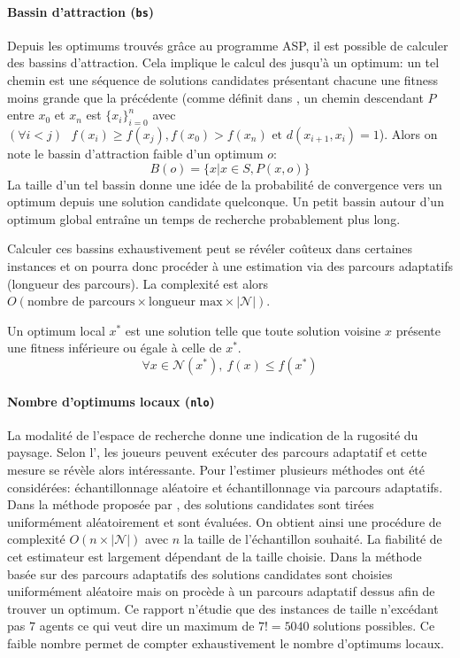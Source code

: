 \documentclass[../main.tex]{subfiles}
\begin{document}
	\paragraph{Bassin d'attraction (\texttt{bs})}{Depuis les optimums trouvés grâce au programme ASP, il est possible de calculer des bassins d'attraction. Cela implique le calcul des  jusqu'à un optimum: un tel chemin est une séquence de solutions candidates présentant chacune une fitness moins grande que la précédente (comme définit dans \cite{pitzer}, un chemin descendant $P$ entre $x_0$ et $x_n$ est $\{x_i\}_{i=0}^n$ avec $(\forall i < j)\text{ }f(x_i) \geq f(x_j), f(x_0) > f(x_n) \text{ et } d(x_{i+1}, x_i) = 1$). Alors on note le bassin d'attraction faible d'un optimum $o$:
	\begin{equation*}
	    B(o) = \{x | x \in S, P(x, o)\}
	\end{equation*}
La taille d'un tel bassin donne une idée de la probabilité de convergence vers un optimum depuis une solution candidate quelconque. Un petit bassin autour d'un optimum global entraîne un temps de recherche probablement plus long.

Calculer ces bassins exhaustivement peut se révéler coûteux dans certaines instances et on pourra donc procéder à une estimation via des parcours adaptatifs \cite{garnier} (longueur des parcours). La complexité est alors $O(\text{nombre de parcours} \times \text{longueur max} \times |\mathcal{N}|)$.
	}
	
\begin{definition}
    Un optimum local $x^*$ est une solution telle que toute solution voisine $x$ présente une fitness inférieure ou égale à celle de $x^*$.
    \begin{equation*}
        \forall x \in \mathcal{N}(x^*),~f(x) \leq f(x^*)
    \end{equation*}
\end{definition}

    \paragraph{Nombre d'optimums locaux (\texttt{nlo})}{
La modalité de l'espace de recherche donne une indication de la rugosité du paysage. Selon l', les joueurs peuvent exécuter des parcours adaptatif et cette mesure se révèle alors intéressante. Pour l'estimer plusieurs méthodes ont été considérées: échantillonnage aléatoire et échantillonnage via parcours adaptatifs. Dans la méthode proposée par \cite{alyahya}, des solutions candidates sont tirées uniformément aléatoirement et sont évaluées. On obtient ainsi une procédure de complexité $O(n \times |\mathcal{N}|)$ avec $n$ la taille de l'échantillon souhaité. La fiabilité de cet estimateur est largement dépendant de la taille choisie. Dans la méthode basée sur des parcours adaptatifs des solutions candidates sont choisies uniformément aléatoire mais on procède à un parcours adaptatif dessus afin de trouver un optimum. Ce rapport n'étudie que des instances de taille n'excédant pas $7$ agents ce qui veut dire un maximum de $7! = 5040$ solutions possibles. Ce faible nombre permet de compter exhaustivement le nombre d'optimums locaux.
    }
	
\end{document}
